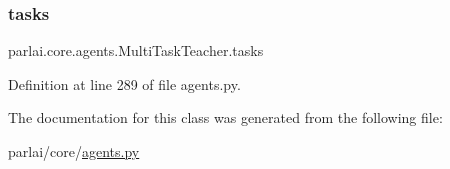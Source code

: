 \subsubsection{\texorpdfstring{tasks}{tasks}}
{\footnotesize\ttfamily parlai.\+core.\+agents.\+Multi\+Task\+Teacher.\+tasks}



Definition at line 289 of file agents.\+py.



The documentation for this class was generated from the following file\+:\begin{DoxyCompactItemize}
\item 
parlai/core/\hyperlink{parlai_2core_2agents_8py}{agents.\+py}\end{DoxyCompactItemize}
